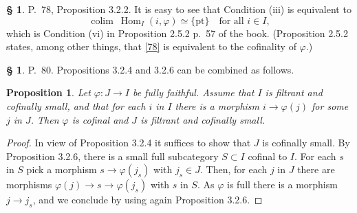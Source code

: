 \documentclass[12pt]{article}%
\newtheorem{prop}[thm]{Proposition}
\theoremstyle{remark}
\theoremstyle{definition}
\newtheorem{s}[thm]{\S}%
\newcommand{\pt}{\{\text{pt}\}}
\DeclareMathOperator*{\colim}{colim}
\DeclareMathOperator{\Hom}{Hom}%
\begin{document}
%

\begin{s} 
P.~78, Proposition 3.2.2. It is easy to see that Condition (iii) is equivalent to
%
\begin{equation}\label{78} 
\colim\ \Hom_I(i,\varphi)\simeq\pt\quad\text{for all }i\in I, 
\end{equation} 
%
which is Condition (vi) in Proposition 2.5.2 p.~57 of the book. (Proposition 2.5.2 states, among other things, that \eqref{78} is equivalent to the cofinality of $\varphi$.)
\end{s}

%

\begin{s} 
P.~80. Propositions 3.2.4 and 3.2.6 can be combined as follows. 

\begin{prop}\label{comb}
Let $\varphi:J\to I$ be fully faithful. Assume that $I$ is filtrant and cofinally small, and that for each $i$ in $I$ there is a morphism $i\to\varphi(j)$ for some $j$ in $J$. Then $\varphi$ is cofinal and $J$ is filtrant and cofinally small. 
\end{prop} 

\begin{proof}
In view of Proposition 3.2.4 it suffices to show that $J$ is cofinally small. By Proposition 3.2.6, there is a small full subcategory $S\subset I$ cofinal to $I$. For each $s$ in $S$ pick a morphism $s\to\varphi(j_s)$ with $j_s\in J$. Then, for each $j$ in $J$ there are morphisms $\varphi(j)\to s\to\varphi(j_s)$ with $s$ in $S$. As $\varphi$ is full there is a morphism $j\to j_s$, and we conclude by using again Proposition 3.2.6.
\end{proof}
\end{s}

%
\end{document}
